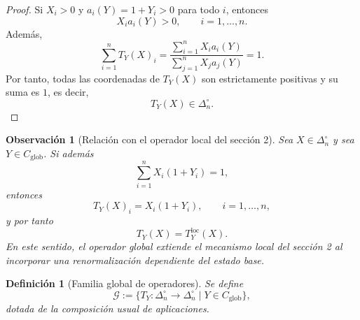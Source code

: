 ﻿\documentclass[12pt]{article}
\newtheorem{definicion}{Definición}[section]
\newtheorem{observacion}{Observación}[section]
\begin{document}
\begin{proof}
Si $X_i>0$ y $a_i(Y)=1+Y_i>0$ para todo $i$, entonces
\[
X_i a_i(Y)>0,\qquad i=1,\dots,n.
\]
Además,
\[
\sum_{i=1}^n T_Y(X)_i
=
\frac{\sum_{i=1}^n X_i a_i(Y)}{\sum_{j=1}^n X_j a_j(Y)}
=
1.
\]
Por tanto, todas las coordenadas de $T_Y(X)$ son estrictamente positivas y su suma es $1$, es decir,
\[
T_Y(X)\in\Delta_n^\circ.
\]
\end{proof}

\begin{observacion}[Relación con el operador local del sección 2]\label{obs:localVsGlobal}
Sea $X\in\Delta_n^\circ$ y sea $Y\in C_{\mathrm{glob}}$. Si además
\[
\sum_{i=1}^n X_i(1+Y_i)=1,
\]
entonces
\[
T_Y(X)_i=X_i(1+Y_i),\qquad i=1,\dots,n,
\]
y por tanto
\[
T_Y(X)=T_Y^{\mathrm{loc}}(X).
\]
En este sentido, el operador global extiende el mecanismo local del sección 2 al incorporar una renormalización dependiente del estado base.
\end{observacion}

\begin{definicion}[Familia global de operadores]\label{def:G}
Se define
\[
\mathcal G
:=
\bigl\{
T_Y:\Delta_n^\circ\to\Delta_n^\circ
\;\big|\;
Y\in C_{\mathrm{glob}}
\bigr\},
\]
dotada de la composición usual de aplicaciones.
\end{definicion}
\end{document}
